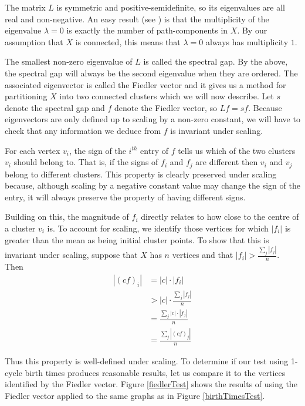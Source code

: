 \documentclass[12pt,a4paper]{amsart}
\numberwithin{equation}{section}
\def\l{\lambda}
\theoremstyle{plain}
\theoremstyle{definition}
\begin{document}
The matrix $L$ is symmetric and positive-semidefinite, so its eigenvalues are all real and non-negative. An easy result (see \cite{fiedler}) is that the multiplicity of the eigenvalue $\l = 0$ is exactly the number of path-components in $X$. By our assumption that $X$ is connected, this means that $\l = 0$ always has multiplicity $1$.

The smallest non-zero eigenvalue of $L$ is called the spectral gap. By the above, the spectral gap will always be the second eigenvalue when they are ordered. The associated eigenvector is called the Fiedler vector and it gives us a method for partitioning $X$ into two connected clusters which we will now describe. Let $s$ denote the spectral gap and $f$ denote the Fiedler vector, so $Lf = sf$. Because eigenvectors are only defined up to scaling by a non-zero constant, we will have to check that any information we deduce from $f$ is invariant under scaling. 

For each vertex $v_i$, the sign of the $i^{th}$ entry of $f$ tells us which of the two clusters $v_i$ should belong to. That is, if the signs of $f_i$ and $f_j$ are different then $v_i$ and $v_j$ belong to different clusters. This property is clearly preserved under scaling because, although scaling by a negative constant value may change the sign of the entry, it will always preserve the property of having different signs.

Building on this, the magnitude of $f_i$ directly relates to how close to the centre of a cluster $v_i$ is. To account for scaling, we identify those vertices for which $|f_i|$ is greater than the mean as being initial cluster points. To show that this is invariant under scaling, suppose that $X$ has $n$ vertices and that $|f_i| > \frac{\sum_j |f_j|}{n}$. Then
\begin{align*}
|(cf)_i| &= |c| \cdot |f_i| \\
&> |c| \cdot \frac{\sum_j |f_j|}{n} \\
&= \frac{\sum_j|c| \cdot |f_j|}{n} \\
&= \frac{\sum_j |(cf)_j|}{n}
\end{align*}

Thus this property is well-defined under scaling. To determine if our test using 1-cycle birth times produces reasonable results, let us compare it to the vertices identified by the Fiedler vector. Figure \ref{fiedlerTest} shows the results of using the Fiedler vector applied to the same graphs as in Figure \ref{birthTimesTest}. 
\end{document}
